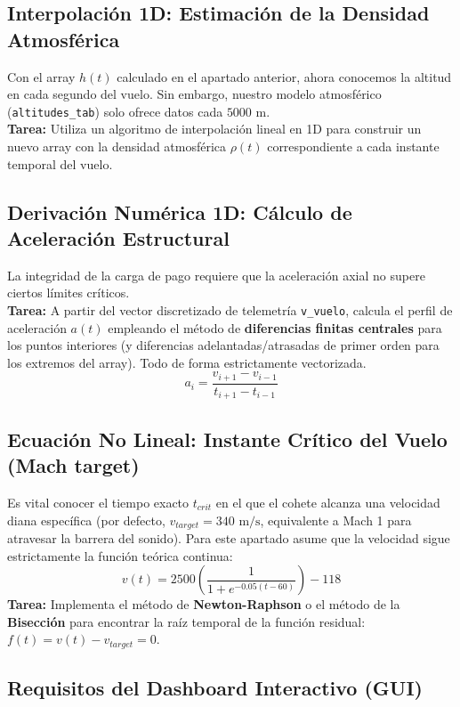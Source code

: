 	\subsection*{Interpolación 1D: Estimación de la Densidad Atmosférica}
	Con el array $h(t)$ calculado en el apartado anterior, ahora conocemos la altitud en cada segundo del vuelo. Sin embargo, nuestro modelo atmosférico (\texttt{altitudes\_tab}) solo ofrece datos cada $5000 \text{ m}$.\\
	\textbf{Tarea:} Utiliza un algoritmo de interpolación 
	lineal en 1D  para construir un nuevo array con la densidad atmosférica $\rho(t)$ correspondiente a cada instante temporal del vuelo.
	
	\subsection*{Derivación Numérica 1D: Cálculo de Aceleración Estructural}
	La integridad de la carga de pago requiere que la aceleración axial no supere ciertos límites críticos.\\
	\textbf{Tarea:} A partir del vector discretizado de telemetría \texttt{v\_vuelo}, calcula el perfil de aceleración $a(t)$ empleando el método de \textbf{diferencias finitas centrales} para los puntos interiores (y diferencias adelantadas/atrasadas de primer orden para los extremos del array). Todo de forma estrictamente vectorizada.
	\[ a_i = \frac{v_{i+1} - v_{i-1}}{t_{i+1} - t_{i-1}} \]
	
	\subsection*{Ecuación No Lineal: Instante Crítico del Vuelo (Mach target)}
	Es vital conocer el tiempo exacto $t_{crit}$ en el que el cohete alcanza una velocidad diana específica (por defecto, $v_{target} = 340 \text{ m/s}$, equivalente a Mach 1 para atravesar la barrera del sonido). Para este apartado asume que la velocidad sigue estrictamente la función teórica continua:
	\[ v(t) = 2500 \left( \frac{1}{1 + e^{-0.05(t-60)}} \right) - 118 \]
	\textbf{Tarea:} Implementa el método de \textbf{Newton-Raphson} o el método de la \textbf{Bisección} para encontrar la raíz temporal de la función residual: $f(t) = v(t) - v_{target} = 0$.
	
	\subsection*{Requisitos del Dashboard Interactivo (GUI)}
	

